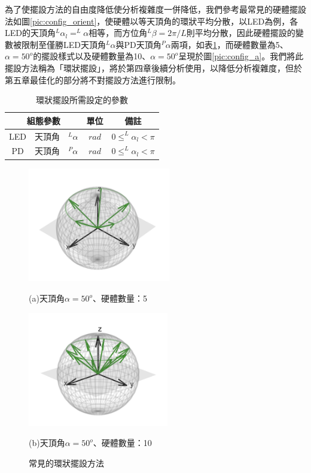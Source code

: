 為了使擺設方法的自由度降低使分析複雜度一併降低，我們參考最常見的硬體擺設法如圖\ref{pic:config_orient}，使硬體以等天頂角的環狀平均分散，以LED為例，各LED的天頂角$^L\alpha_l = ^L\alpha$相等，而方位角$^L\beta = 2\pi/L$則平均分散，因此硬體擺設的變數被限制至僅勝LED天頂角$^L\alpha$與PD天頂角$^P\alpha$兩項，如表\ref{tab:para_restrict_config}，而硬體數量為5、$\alpha=50^o$的擺設樣式以及硬體數量為10、$\alpha=50^o$呈現於圖\ref{pic:config_a}。我們將此擺設方法稱為「環狀擺設」，將於第四章後續分析使用，以降低分析複雜度，但於第五章最佳化的部分將不對擺設方法進行限制。

\begin{table}[htpb]
    \caption{環狀擺設所需設定的參數}
    \label{tab:para_restrict_config}
    \centering
    \begin{tabular}{|c|cc|c|c|}
    \hline
    \multicolumn{3}{|c|}{\textbf{組態參數}}  &\textbf{單位}  &  \textbf{備註}   \\
    \hline
    {LED} 
    & 天頂角 &$^L \alpha$ & $rad$ & $0\leq ^L \alpha_l<\pi$ \\\hline
    {PD} 
    & 天頂角 &$^P \alpha$ & $rad$ & $0\leq ^L \alpha_l<\pi$ \\\hline

    \end{tabular}
\end{table}

\begin{figure}[htpb]
    \centering
    \begin{minipage}{.5\textwidth}
        \centering
        \includegraphics[height=5cm]{ch4pic/config_a.png}
        \captionsetup{labelformat=empty}
        \caption*{(a)天頂角$\alpha=50^o$、硬體數量：5}
    \end{minipage}%
    \begin{minipage}{0.5\textwidth}
        \centering
        \includegraphics[height=5cm]{ch4pic/config_b.png}
        \captionsetup{labelformat=empty}
        \caption*{(b)天頂角$\alpha=50^o$、硬體數量：10}
    \end{minipage}
    \caption{常見的環狀擺設方法}
    \label{fig:config_a}
\end{figure}



